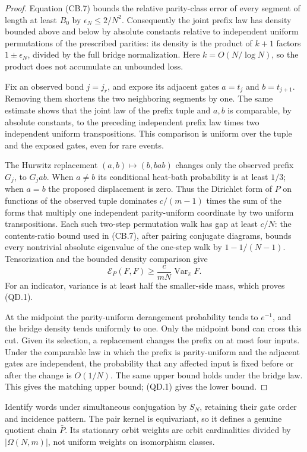 \begin{proof}
Equation (CB.7) bounds the relative parity-class error of every segment
of length at least $B_0$ by $\epsilon_N\le2/N^2$.  Consequently the
joint prefix law has density bounded above and below by absolute constants
relative to independent uniform permutations of the prescribed parities:
its density is the product of $k+1$ factors $1\pm\epsilon_N$, divided by
the full bridge normalization.  Here $k=O(N/\log N)$, so the product
does not accumulate an unbounded loss.

Fix an observed bond $j=j_r$, and expose its adjacent gates $a=t_j$ and
$b=t_{j+1}$.  Removing them shortens the two neighboring segments by one.
The same estimate shows that the joint law of the prefix tuple and $a,b$
is comparable, by absolute constants, to the preceding independent
prefix law times two independent uniform transpositions.  This comparison
is uniform over the tuple and the exposed gates, even for rare events.

The Hurwitz replacement $(a,b)\mapsto(b,bab)$ changes only the observed
prefix $G_j$, to $G_jab$.  When $a\ne b$ its conditional heat-bath
probability is at least $1/3$; when $a=b$ the proposed displacement is
zero.  Thus the Dirichlet form of $P$ on functions of the observed tuple
dominates $c/(m-1)$ times the sum of the forms that multiply one
independent parity-uniform coordinate by two uniform transpositions.
Each such two-step permutation walk has gap at least $c/N$: the
contents-ratio bound used in (CB.7), after pairing conjugate diagrams,
bounds every nontrivial absolute eigenvalue of the one-step walk by
$1-1/(N-1)$.  Tensorization and the bounded density comparison give
\[
 \mathcal E_P(F,F)\ge\frac{c}{mN}\operatorname{Var}_\pi F.
\]
For an indicator, variance is at least half the smaller-side mass,
which proves (QD.1).

At the midpoint the parity-uniform derangement probability tends to
$e^{-1}$, and the bridge density tends uniformly to one.  Only the
midpoint bond can cross this cut.  Given its selection, a replacement
changes the prefix on at most four inputs.  Under the comparable law in
which the prefix is parity-uniform and the adjacent gates are independent,
the probability that any affected input is fixed before or after the
change is $O(1/N)$.  The same upper bound holds under the bridge law.
This gives the matching upper bound; (QD.1) gives the lower bound.
\end{proof}

Identify words under simultaneous conjugation by $S_N$, retaining their
gate order and incidence pattern.  The pair kernel is equivariant, so it
defines a genuine quotient chain $\bar P$.  Its stationary orbit weights
are orbit cardinalities divided by $|\Omega(N,m)|$, not uniform weights
on isomorphism classes.

